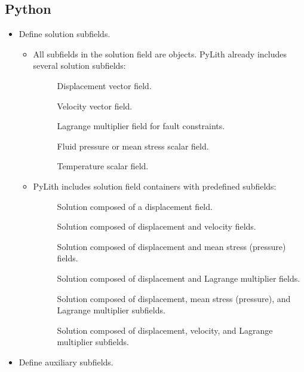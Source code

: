 \subsection{Python}

\begin{itemize}
\item Define solution subfields.

  \begin{itemize}
  \item All subfields in the solution field are 
    objects. PyLith already includes several solution subfields:
    \begin{description}
    \item[] Displacement vector field.
    \item[] Velocity vector field.
    \item[] Lagrange multiplier field for
      fault constraints.
    \item[] Fluid pressure or mean stress scalar field.
    \item[] Temperature scalar field.
    \end{description}
  \item PyLith includes solution field containers with predefined
    subfields:
    \begin{description}
    \item[] Solution composed of a displacement field.
    \item[] Solution composed of displacement and velocity fields.
    \item[] Solution composed of displacement and
      mean stress (pressure) fields.
    \item[] Solution composed of displacement
      and Lagrange multiplier fields.
    \item[] Solution composed of
      displacement, mean stress (pressure), and Lagrange multiplier subfields.
    \item[] Solution composed of
      displacement, velocity, and Lagrange multiplier subfields.
    \end{description}
  \end{itemize}
%
\item Define auxiliary subfields.


\end{itemize}
